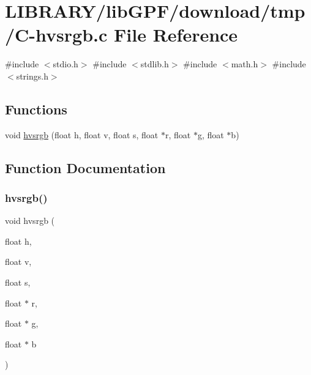 \hypertarget{C-hvsrgb_8c}{}\section{L\+I\+B\+R\+A\+R\+Y/lib\+G\+P\+F/download/tmp/\+C-\/hvsrgb.c File Reference}
\label{C-hvsrgb_8c}
{\ttfamily \#include $<$stdio.\+h$>$}\newline
{\ttfamily \#include $<$stdlib.\+h$>$}\newline
{\ttfamily \#include $<$math.\+h$>$}\newline
{\ttfamily \#include $<$strings.\+h$>$}\newline
\subsection*{Functions}
\begin{DoxyCompactItemize}
\item 
void \hyperlink{C-hvsrgb_8c_a3e696875abb711e0bda0e666bf6828e3}{hvsrgb} (float h, float v, float s, float $\ast$r, float $\ast$g, float $\ast$b)
\end{DoxyCompactItemize}


\subsection{Function Documentation}
\mbox{\label{C-hvsrgb_8c_a3e696875abb711e0bda0e666bf6828e3}} 
\subsubsection{\texorpdfstring{hvsrgb()}{hvsrgb()}}
{\footnotesize\ttfamily void hvsrgb (\begin{DoxyParamCaption}\item[{float}]{h,  }\item[{float}]{v,  }\item[{float}]{s,  }\item[{float $\ast$}]{r,  }\item[{float $\ast$}]{g,  }\item[{float $\ast$}]{b }\end{DoxyParamCaption})}

